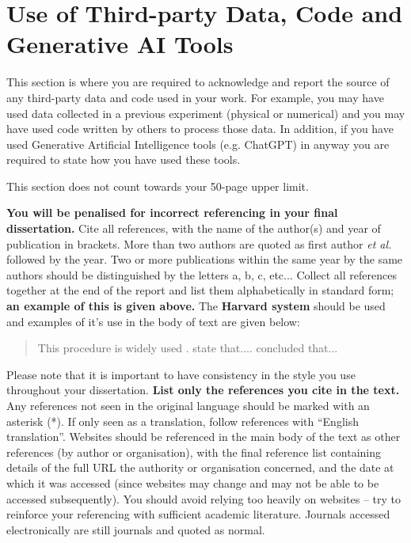 \documentclass[a4paper,12pt]{article}
\begin{document}
\section{Use of Third-party Data, Code and Generative AI Tools}
\label{sec:DCG_Usaage}

This section is where you are required to acknowledge and report the source of any third-party data and code used in your work. For example, you may have used data collected in a previous experiment (physical or numerical) and you may have used code written by others to process those data. In addition, if you have used Generative Artificial Intelligence tools (e.g. ChatGPT) in anyway you are required to state how you have used these tools.

This section does not count towards your 50-page upper limit.

\clearpage





\vspace*{10mm}

\textbf{You will be penalised for incorrect referencing in your final dissertation.} Cite all references, with the name of the author(s) and year of publication in brackets. More than
two authors are quoted as first author \textit{et al.} followed by the year.  Two or more publications within
the same year by the same authors should be distinguished by the letters a, b, c, etc... Collect all
references together at the end of the report and list them alphabetically in standard form; \textbf{an
example of this is given above.} The \textbf{Harvard system} should be used and examples of it’s use in the body of text are given below:


\begin{quote}
This procedure is widely used \citep{Christou2009,Wu2016,Hughes2016a,Hughes2016b}. \citet{Christou2014} state that.... \citet{Spinneken2009a,Spinneken2009b} concluded that...
\end{quote}


Please note that it is important to have consistency in the style you use throughout your dissertation. \textbf{List only the references you cite in the text.} Any references not seen in the original language should be marked with an asterisk (*). If only seen as a translation, follow references with ``English translation''. Websites should be referenced in the main body of the text as other references (by author or organisation), with the final reference list containing details of the full URL the authority or organisation concerned, and the date at which it was accessed (since websites may change and may not be able to be accessed subsequently). You should avoid relying too heavily on websites – try to reinforce your referencing with sufficient academic literature. Journals accessed electronically are still journals and quoted as normal.
\end{document}
